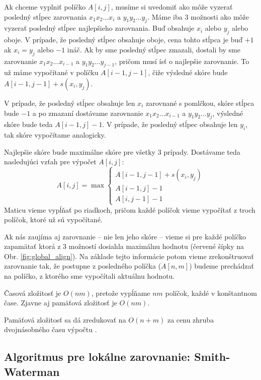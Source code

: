 Ak chceme vyplniť políčko $A[i,j]$, musíme si uvedomiť ako môže vyzerať posledný stĺpec zarovnania $x_1x_2\dots x_i$ a $y_1y_2\dots y_j$. Máme iba 3 možnosti ako môže vyzerať posledný stĺpec najlepšieho zarovnania. Buď obsahuje $x_i$ alebo $y_j$ alebo oboje. V prípade, že posledný stĺpec obsahuje oboje, cena tohto stĺpca je buď $+1$ ak $x_i = y_j$ alebo $-1$ ináč. Ak by sme posledný stĺpec zmazali, dostali by sme zarovnanie $x_1x_2\dots x_{i-1}$ a $y_1y_2\dots y_{j-1}$, pričom musí ísť o najlepšie zarovnanie. To už máme vypočítané v políčku $A[i-1, j-1]$, čiže výsledné skóre bude $A[i-1, j-1] + s(x_i,y_j)$.

V prípade, že posledný stĺpec obsahuje len $x_i$ zarovnané s pomlčkou, skóre stĺpca bude $-1$ a po zmazaní dostávame zarovnanie $x_1x_2\dots x_{i-1}$ a $y_1y_2\dots y_{j}$, výsledné skóre bude teda $A[i-1, j] -1$. V prípade, že posledný stĺpec obsahuje len $y_i$, tak skóre vypočítame analogicky.

Najlepšie skóre bude maximálne skóre pre všetky 3 prípady.
Dostávame teda nasledujúci vzťah pre výpočet $A[i,j]$:
$$A[i,j] = \max \left\{ 
\begin{array}{l}
A[i-1,j-1]+s(x_i, y_j)\\ 
A[i-1,j]-1\\
A[i,j-1]-1 
\end{array} \right.$$
Maticu vieme vypĺňať po riadkoch, pričom každé políčok vieme vypočítať z troch políčok, ktoré už sú vypočítané. 

Ak nás zaujíma aj zarovnanie -- nie len jeho skóre -- vieme si pre každé políčko zapamätať ktorá z 3 možností dosiahla maximálnu hodnotu 
(červené šípky na Obr. \ref{fig:global_align}). Na základe tejto informácie potom vieme zrekonštruovať zarovnanie tak, že postupne z posledného políčka ($A[n,m]$) budeme prechádzať na políčko, z ktorého sme vypočítali aktuálnu hodnotu.

Časová zložitosť je $O(nm)$, pretože vypĺňame $nm$ políčok, každé v konštantnom čase. Zjavne aj pamäťová zložitosť je $O(nm)$.

Pamäťová zložitosť sa dá zredukovať na $O(n+m)$ za cenu zhruba dvojnásobného času výpočtu \cite{hirschberg}.

\subsection{Algoritmus pre lokálne zarovnanie: Smith-Waterman}


